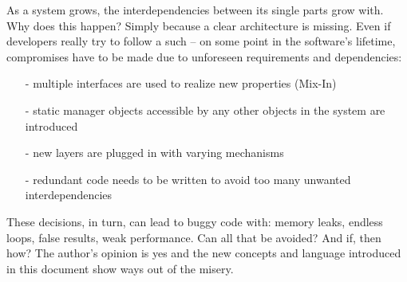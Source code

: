 As a system grows, the interdependencies between its single parts grow with.
Why does this happen? Simply because a clear architecture is missing. Even if
developers really try to follow a such -- on some point in the software's
lifetime, compromises have to be made due to unforeseen requirements and
dependencies:

\begin{itemize}
    \item[-]{multiple interfaces are used to realize new properties (Mix-In)}
    \item[-]{static manager objects accessible by any other objects in the system
        are introduced}
    \item[-]{new layers are plugged in with varying mechanisms}
    \item[-]{redundant code needs to be written to avoid too many unwanted
        interdependencies}
\end{itemize}

These decisions, in turn, can lead to buggy code with: memory leaks, endless loops,
false results, weak performance.
Can all that be avoided? And if, then how? The author's opinion is yes and the
new concepts and language introduced in this document show ways out of the misery.
